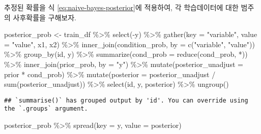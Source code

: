 \documentclass[
]{book}
\newenvironment{Shaded}{\begin{snugshade}}{\end{snugshade}}
\newcommand{\AttributeTok}[1]{\textcolor[rgb]{0.77,0.63,0.00}{#1}}
\newcommand{\FunctionTok}[1]{\textcolor[rgb]{0.00,0.00,0.00}{#1}}
\newcommand{\NormalTok}[1]{#1}
\newcommand{\OtherTok}[1]{\textcolor[rgb]{0.56,0.35,0.01}{#1}}
\newcommand{\SpecialCharTok}[1]{\textcolor[rgb]{0.00,0.00,0.00}{#1}}
\newcommand{\StringTok}[1]{\textcolor[rgb]{0.31,0.60,0.02}{#1}}
\begin{document}
추정된 확률을 식 \eqref{eq:naive-bayes-posterior}에 적용하여, 각 학습데이터에 대한 범주의 사후확률을 구해보자.

\begin{Shaded}
\begin{Highlighting}[]
\NormalTok{posterior\_prob }\OtherTok{\textless{}{-}}\NormalTok{ train\_df }\SpecialCharTok{\%\textgreater{}\%}
  \FunctionTok{select}\NormalTok{(}\SpecialCharTok{{-}}\NormalTok{y) }\SpecialCharTok{\%\textgreater{}\%}
  \FunctionTok{gather}\NormalTok{(}\AttributeTok{key =} \StringTok{"variable"}\NormalTok{, }\AttributeTok{value =} \StringTok{"value"}\NormalTok{, x1, x2) }\SpecialCharTok{\%\textgreater{}\%}
  \FunctionTok{inner\_join}\NormalTok{(condition\_prob, }\AttributeTok{by =} \FunctionTok{c}\NormalTok{(}\StringTok{"variable"}\NormalTok{, }\StringTok{"value"}\NormalTok{)) }\SpecialCharTok{\%\textgreater{}\%}
  \FunctionTok{group\_by}\NormalTok{(id, y) }\SpecialCharTok{\%\textgreater{}\%}
  \FunctionTok{summarize}\NormalTok{(}\AttributeTok{cond\_prob =} \FunctionTok{reduce}\NormalTok{(cond\_prob, }\StringTok{\textasciigrave{}}\AttributeTok{*}\StringTok{\textasciigrave{}}\NormalTok{)) }\SpecialCharTok{\%\textgreater{}\%}
  \FunctionTok{inner\_join}\NormalTok{(prior\_prob, }\AttributeTok{by =} \StringTok{"y"}\NormalTok{) }\SpecialCharTok{\%\textgreater{}\%}
  \FunctionTok{mutate}\NormalTok{(}\AttributeTok{posterior\_unadjust =}\NormalTok{ prior }\SpecialCharTok{*}\NormalTok{ cond\_prob) }\SpecialCharTok{\%\textgreater{}\%}
  \FunctionTok{mutate}\NormalTok{(}\AttributeTok{posterior =}\NormalTok{ posterior\_unadjust }\SpecialCharTok{/} \FunctionTok{sum}\NormalTok{(posterior\_unadjust)) }\SpecialCharTok{\%\textgreater{}\%}
  \FunctionTok{select}\NormalTok{(id, y, posterior) }\SpecialCharTok{\%\textgreater{}\%}
  \FunctionTok{ungroup}\NormalTok{()}
\end{Highlighting}
\end{Shaded}

\begin{verbatim}
## `summarise()` has grouped output by 'id'. You can override using the `.groups` argument.
\end{verbatim}

\begin{Shaded}
\begin{Highlighting}[]
\NormalTok{posterior\_prob }\SpecialCharTok{\%\textgreater{}\%}
  \FunctionTok{spread}\NormalTok{(}\AttributeTok{key =}\NormalTok{ y, }\AttributeTok{value =}\NormalTok{ posterior)}
\end{Highlighting}
\end{Shaded}
\end{document}
